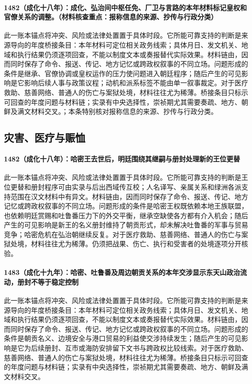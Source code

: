 \paragraph{1482（成化十八年）：成化、弘治间中枢任免、厂卫与言路的本年材料标记皇权和官僚关系的调整。（材料核查重点：报称信息的来源、抄传与行政分类）} 此一账本锚点将冲突、风险或法律处置置于具体时段。它所能可靠支持的判断是来源导向的年度桥接条目：本年材料可定位相关政务线索；具体月日、发文机关、地域和执行结果仍须逐项回查，不能以制度文本或奏报替代实际效果。材料链由，因而同时保存了命令、报送、传记、地方记忆或跨政权叙事的不同立场。问题形成的条件是继承、官僚协调或皇权运作的压力使问题进入朝廷程序；随后产生的可见影响是它影响后续人事与政策议程；动机和派系标签不能由单一叙事裁定。对于医疗救助、慈善网络、普通人的伤亡与案狱处境，材料往往尤为稀薄。桥接条目只标示可回查的年度问题与材料链；实录有中央选择性，崇祯期尤其需要奏疏、地方、朝鲜及满文材料交叉。；本条特别核对报称信息的来源、抄传与行政分类。

\subsection{灾害、医疗与赈恤}

\paragraph{1482（成化十八年）：哈密王去世后，明廷围绕其继嗣与册封处理新的王位更替} 此一账本锚点将冲突、风险或法律处置置于具体时段。它所能可靠支持的判断是王位更替和册封程序可由实录与后出西域传互校；人名译写、亲属关系和绿洲各派支持范围在汉文材料中有异文。材料链由，因而同时保存了命令、报送、传记、地方记忆或跨政权叙事的不同立场。问题形成的条件是哈密王权既依赖本地王族联盟，也依赖明廷赏赐和吐鲁番压力下的外交平衡，继承空缺使各方都有介入机会；随后产生的可见影响是新王的名义册封维持了朝贡形式，却未解决吐鲁番的军事与贸易竞争；哈密危机在弘治朝继续反复。对于医疗救助、慈善网络、普通人的伤亡与案狱处境，材料往往尤为稀薄。仍须把战果、伤亡、执行和受害者的处境逐项分开核验。

\paragraph{1483（成化十九年）：哈密、吐鲁番及周边朝贡关系的本年交涉显示东天山政治流动，册封不等于稳定控制} 此一账本锚点将冲突、风险或法律处置置于具体时段。它所能可靠支持的判断是来源导向的年度桥接条目：本年材料可定位相关政务线索；具体月日、发文机关、地域和执行结果仍须逐项回查，不能以制度文本或奏报替代实际效果。材料链由，因而同时保存了命令、报送、传记、地方记忆或跨政权叙事的不同立场。问题形成的条件是朝贡名义、边境安全与港口贸易的利益使交涉持续发生；随后产生的可见影响是它为后续册封、互市或海防安排留下文书与跨政权比较线索。对于医疗救助、慈善网络、普通人的伤亡与案狱处境，材料往往尤为稀薄。桥接条目只标示可回查的年度问题与材料链；实录有中央选择性，崇祯期尤其需要奏疏、地方、朝鲜及满文材料交叉。

